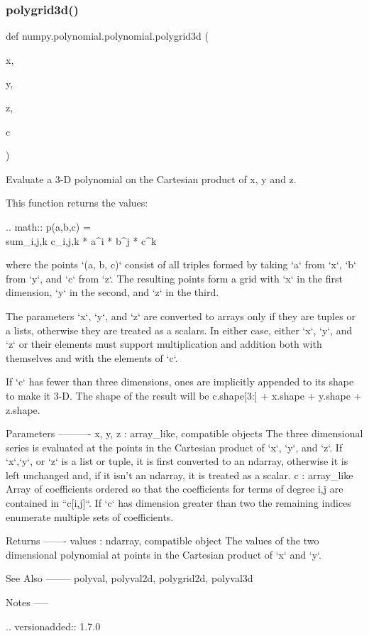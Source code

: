 \subsubsection{\texorpdfstring{polygrid3d()}{polygrid3d()}}
{\footnotesize\ttfamily def numpy.\+polynomial.\+polynomial.\+polygrid3d (\begin{DoxyParamCaption}\item[{}]{x,  }\item[{}]{y,  }\item[{}]{z,  }\item[{}]{c }\end{DoxyParamCaption})}

\begin{DoxyVerb}Evaluate a 3-D polynomial on the Cartesian product of x, y and z.

This function returns the values:

.. math:: p(a,b,c) = \\sum_{i,j,k} c_{i,j,k} * a^i * b^j * c^k

where the points `(a, b, c)` consist of all triples formed by taking
`a` from `x`, `b` from `y`, and `c` from `z`. The resulting points form
a grid with `x` in the first dimension, `y` in the second, and `z` in
the third.

The parameters `x`, `y`, and `z` are converted to arrays only if they
are tuples or a lists, otherwise they are treated as a scalars. In
either case, either `x`, `y`, and `z` or their elements must support
multiplication and addition both with themselves and with the elements
of `c`.

If `c` has fewer than three dimensions, ones are implicitly appended to
its shape to make it 3-D. The shape of the result will be c.shape[3:] +
x.shape + y.shape + z.shape.

Parameters
----------
x, y, z : array_like, compatible objects
    The three dimensional series is evaluated at the points in the
    Cartesian product of `x`, `y`, and `z`.  If `x`,`y`, or `z` is a
    list or tuple, it is first converted to an ndarray, otherwise it is
    left unchanged and, if it isn't an ndarray, it is treated as a
    scalar.
c : array_like
    Array of coefficients ordered so that the coefficients for terms of
    degree i,j are contained in ``c[i,j]``. If `c` has dimension
    greater than two the remaining indices enumerate multiple sets of
    coefficients.

Returns
-------
values : ndarray, compatible object
    The values of the two dimensional polynomial at points in the Cartesian
    product of `x` and `y`.

See Also
--------
polyval, polyval2d, polygrid2d, polyval3d

Notes
-----

.. versionadded:: 1.7.0\end{DoxyVerb}
 \mbox{\label{namespacenumpy_1_1polynomial_1_1polynomial_a5e217368faff45af13299f379f16419f}} 
